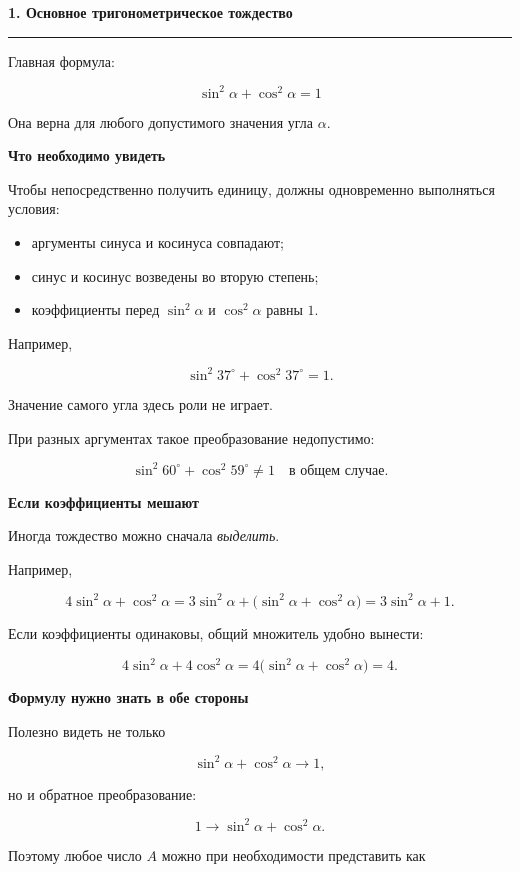\documentclass[a4paper,12pt]{article}
\newcommand{\maintitle}[1]{%
  {\Large\bfseries\color{darkaccent}#1\par}
  \vspace{0.5em}
  {\color{accent}\rule{\linewidth}{0.7pt}\par}
  \vspace{0.8em}
}
\newcommand{\subheading}[1]{%
  \vspace{0.7em}
  {\large\bfseries\color{darkaccent}#1\par}
  \vspace{0.25em}
}
\begin{document}
\maintitle{1. Основное тригонометрическое тождество}

Главная формула:

\[
\boxed{\sin^2\alpha+\cos^2\alpha=1}
\]

Она верна для любого допустимого значения угла \(\alpha\).

\subheading{Что необходимо увидеть}

Чтобы непосредственно получить единицу, должны одновременно выполняться условия:

\begin{itemize}
  \item аргументы синуса и косинуса совпадают;
  \item синус и косинус возведены во вторую степень;
  \item коэффициенты перед \(\sin^2\alpha\) и \(\cos^2\alpha\) равны \(1\).
\end{itemize}

Например,

\[
\sin^2 37^\circ+\cos^2 37^\circ=1.
\]

Значение самого угла здесь роли не играет.

При разных аргументах такое преобразование недопустимо:

\[
\sin^2 60^\circ+\cos^2 59^\circ\ne 1
\quad\text{в общем случае.}
\]

\subheading{Если коэффициенты мешают}

Иногда тождество можно сначала \emph{выделить}.

Например,

\[
4\sin^2\alpha+\cos^2\alpha
=
3\sin^2\alpha+
\bigl(\sin^2\alpha+\cos^2\alpha\bigr)
=
3\sin^2\alpha+1.
\]

Если коэффициенты одинаковы, общий множитель удобно вынести:

\[
4\sin^2\alpha+4\cos^2\alpha
=
4\bigl(\sin^2\alpha+\cos^2\alpha\bigr)
=
4.
\]

\subheading{Формулу нужно знать в обе стороны}

Полезно видеть не только

\[
\sin^2\alpha+\cos^2\alpha\longrightarrow 1,
\]

но и обратное преобразование:

\[
1\longrightarrow \sin^2\alpha+\cos^2\alpha.
\]

Поэтому любое число \(A\) можно при необходимости представить как
\end{document}
